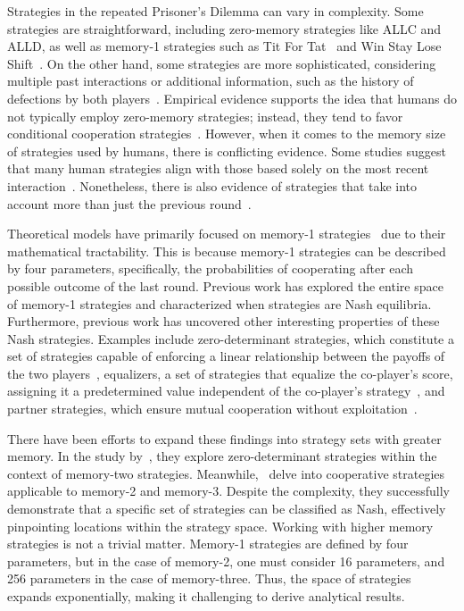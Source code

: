 \documentclass[11pt]{article}
\begin{document}
Strategies in the repeated Prisoner's Dilemma can vary in complexity. Some
strategies are straightforward, including zero-memory strategies like ALLC and
ALLD, as well as memory-1 strategies such as Tit For
Tat~\cite{axelrod:AAAS:1981} and Win Stay Lose Shift~\cite{nowak:Nature:1993}.
On the other hand, some strategies are more sophisticated, considering multiple
past interactions or additional information, such as the history of defections
by both players~\cite{harper:PLOSONE:2017, knight:PLOSONE:2018,
li:NatureCompSci:2022}.
Empirical evidence supports the idea that humans do not typically employ
zero-memory strategies; instead, they tend to favor conditional cooperation
strategies~\cite{fischbacher:AER:2010, rand:Elsevier:2013,
grujic:ScientificReports:2014}. However, when it comes to the memory size of strategies used
by humans, there is conflicting evidence. Some studies suggest that many human
strategies align with those based solely on the most recent
interaction~\cite{engle:ET:2006, dal:AER:2011, camera:GEB:2012, bruttel:TD:2012}.
Nonetheless, there is also evidence of strategies that
take into account more than just the previous round~\cite{fudenberg:AER:2012, romero:EER:2018}.

Theoretical models have primarily focused on memory-1
strategies~\cite{nowak:Nature:1993, nowak:Nature:1992, glynatsi:scientific:2020, press:PNAS:2012,
stewart:scientific:2016, kraines:elsevier:2000,
imhof:ProceedingsB:2010, baek:scientific:2016, hilbe:PNAS:2013,
chen:PNASnexus:2023, hilbe:Nature:2018, akin:EGADS:2016} due to their
mathematical tractability. This is because memory-1 strategies can be described
by four parameters, specifically, the probabilities of cooperating after each
possible outcome of the last round. Previous work has explored the entire space
of memory-1 strategies and characterized when strategies are Nash equilibria.
Furthermore, previous work has uncovered other interesting properties of these
Nash strategies. Examples include zero-determinant strategies, which constitute
a set of strategies capable of enforcing a linear relationship between the
payoffs of the two players~\cite{press:PNAS:2012}, equalizers, a set of
strategies that equalize the co-player's score, assigning it a predetermined
value independent of the co-player's strategy~\cite{hilbe:PNAS:2013}, and
partner strategies, which ensure mutual cooperation without
exploitation~\cite{hilbe:Nature:2018}.

There have been efforts to expand these findings into strategy sets with
greater memory. In the study by~\cite{ueda:RSOP:2021}, they explore
zero-determinant strategies within the context of
memory-two strategies. Meanwhile,~\cite{hilbe:PNAS:2017} delve into cooperative
strategies applicable to memory-2 and memory-3. Despite the complexity, they
successfully demonstrate that a specific set of strategies can be classified as
Nash, effectively pinpointing locations within the strategy space.
Working with higher memory strategies is not a trivial matter. Memory-1
strategies are defined by four parameters, but in the case of memory-2, one must
consider 16 parameters, and 256 parameters in the case of memory-three. Thus, the
space of strategies expands exponentially, making it challenging to derive
analytical results.
\end{document}
